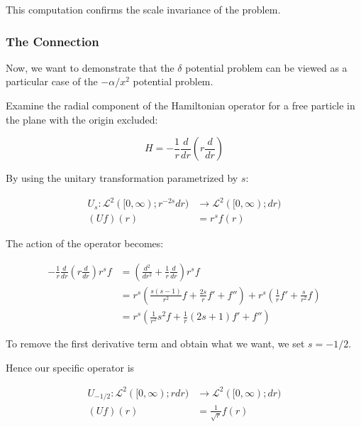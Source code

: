 This computation confirms the scale invariance of the problem.

\subsubsection*{The Connection}

Now, we want to demonstrate that the $\delta$ potential problem can be viewed as a particular case of the $-\alpha/x^2$ potential problem.~\cite{Araujo_10.1119/1.1624111}

\vspace{4mm}
\noindent
Examine the radial component of the Hamiltonian operator for a free particle in the plane with the origin excluded:

\begin{equation*}
    H = - \frac{1}{r} \frac{d}{dr} \left( r \frac{d}{dr} \right)
\end{equation*}

\noindent
By using the unitary transformation parametrized by $s$:

\begin{align*}
    U_s: \mathcal{L}^2([0, \infty); r^{-2s} dr) & \to \mathcal{L}^2([0, \infty); dr) \\
    (Uf)(r)                                   & = r^s f(r)
\end{align*}

\noindent
The action of the operator becomes:

\begin{align*}
    - \frac{1}{r} \frac{d}{dr} \left(r \frac{d}{dr} \right) r^s f
     & = \left( \frac{d^2}{dr^2} + \frac{1}{r} \frac{d}{dr} \right) r^s f \\
     & =  r^s \left( \frac{s(s-1)}{r^2} f + \frac{2s}{r} f' + f'' \right) +  r^s \left( \frac{1}{r} f' + \frac{s}{r^2} f \right) \\
     & = r^s \left(  \frac{1}{r^2} s^2 f + \frac{1}{r} (2s+1) f' + f''  \right)
\end{align*}

\noindent
To remove the first derivative term and obtain what we want, we set $s = -1/2$. 

Hence our specific operator is

\begin{align*}
    U_{-1/2}: \mathcal{L}^2([0, \infty); r dr) & \to \mathcal{L}^2([0, \infty); dr) \\
    (Uf)(r)                                   & = \frac{1}{\sqrt{r}} f(r)
\end{align*}

